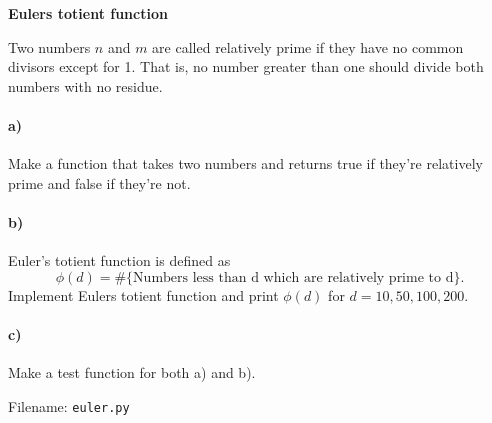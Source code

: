 \begin{Problem}{\textbf{Eulers totient function}}

\noindent Two numbers $n$ and $m$ are called relatively prime if they have no common divisors
except for 1. That is, no number greater than one should divide both numbers with
no residue.

\paragraph{a)}
Make a function that takes two numbers and returns true if they're relatively prime
and false if they're not.

\paragraph{b)}
Euler's totient function is defined as
\begin{equation*}
\phi(d)= \text{\#\{Numbers less than d which are
relatively prime to d\}.}
\end{equation*}
Implement Eulers totient function and print $\phi(d)$ for $d=10,50,100,200$.

\paragraph{c)}
Make a test function for both a) and b).

Filename: \texttt{euler.py}
\end{Problem}


